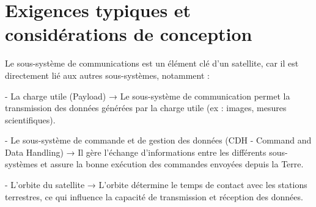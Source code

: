 \section{Exigences typiques et considérations de conception}
Le sous-système de communications est un élément clé d'un satellite, car il est directement lié aux autres sous-systèmes, notamment :

- La charge utile (Payload) → Le sous-système de communication permet la transmission des données générées par la charge utile (ex : images, mesures scientifiques).

- Le sous-système de commande et de gestion des données (CDH - Command and Data Handling) → Il gère l’échange d’informations entre les différents sous-systèmes et assure la bonne exécution des commandes envoyées depuis la Terre.

- L’orbite du satellite → L’orbite détermine le temps de contact avec les stations terrestres, ce qui influence la capacité de transmission et réception des données.


